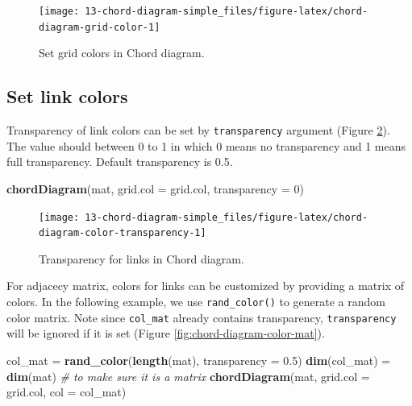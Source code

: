 \documentclass[]{book}
\newenvironment{Shaded}{\begin{snugshade}}{\end{snugshade}}
\newcommand{\KeywordTok}[1]{\textcolor[rgb]{0.13,0.29,0.53}{\textbf{#1}}}
\newcommand{\DataTypeTok}[1]{\textcolor[rgb]{0.13,0.29,0.53}{#1}}
\newcommand{\DecValTok}[1]{\textcolor[rgb]{0.00,0.00,0.81}{#1}}
\newcommand{\FloatTok}[1]{\textcolor[rgb]{0.00,0.00,0.81}{#1}}
\newcommand{\StringTok}[1]{\textcolor[rgb]{0.31,0.60,0.02}{#1}}
\newcommand{\CommentTok}[1]{\textcolor[rgb]{0.56,0.35,0.01}{\textit{#1}}}
\newcommand{\NormalTok}[1]{#1}
\begin{document}
\begin{figure}

{\centering \texttt{[image: 13-chord-diagram-simple\_files/figure-latex/chord-diagram-grid-color-1]} 

}

\caption{Set grid colors in Chord diagram.}\label{fig:chord-diagram-grid-color}
\end{figure}

\subsection{Set link colors}\label{chord-diagram-link-color}

Transparency of link colors can be set by \texttt{transparency} argument
(Figure \ref{fig:chord-diagram-color-transparency}). The value should
between 0 to 1 in which 0 means no transparency and 1 means full
transparency. Default transparency is 0.5.

\begin{Shaded}
\begin{Highlighting}[]
\KeywordTok{chordDiagram}\NormalTok{(mat, }\DataTypeTok{grid.col =}\NormalTok{ grid.col, }\DataTypeTok{transparency =} \DecValTok{0}\NormalTok{)}
\end{Highlighting}
\end{Shaded}

\begin{figure}

{\centering \texttt{[image: 13-chord-diagram-simple\_files/figure-latex/chord-diagram-color-transparency-1]} 

}

\caption{Transparency for links in Chord diagram.}\label{fig:chord-diagram-color-transparency}
\end{figure}

For adjacecy matrix, colors for links can be customized by providing a
matrix of colors. In the following example, we use
\texttt{rand\_color()} to generate a random color matrix. Note since
\texttt{col\_mat} already contains transparency, \texttt{transparency}
will be ignored if it is set (Figure \ref{fig:chord-diagram-color-mat}).

\begin{Shaded}
\begin{Highlighting}[]
\NormalTok{col_mat =}\StringTok{ }\KeywordTok{rand_color}\NormalTok{(}\KeywordTok{length}\NormalTok{(mat), }\DataTypeTok{transparency =} \FloatTok{0.5}\NormalTok{)}
\KeywordTok{dim}\NormalTok{(col_mat) =}\StringTok{ }\KeywordTok{dim}\NormalTok{(mat)  }\CommentTok{# to make sure it is a matrix}
\KeywordTok{chordDiagram}\NormalTok{(mat, }\DataTypeTok{grid.col =}\NormalTok{ grid.col, }\DataTypeTok{col =}\NormalTok{ col_mat)}
\end{Highlighting}
\end{Shaded}
\end{document}
